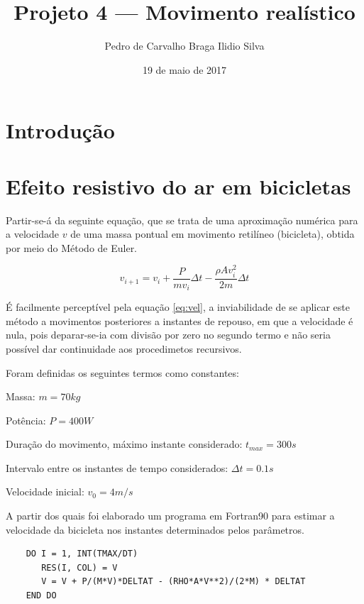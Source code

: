 \message{ !name(relatorio.tex)}\documentclass{article}
\author{Pedro de Carvalho Braga Ilidio Silva}
\title{Projeto 4 — Movimento realístico}
\date{19 de maio de 2017}
\begin{document}

\maketitle
\section{Introdução}

\section{Efeito resistivo do ar em bicicletas}

Partir-se-á da seguinte equação, que se trata de uma aproximação numérica para a velocidade \(v\) de uma massa pontual em movimento retilíneo (bicicleta), obtida por meio do Método de Euler.

\begin{equation}
  \label{eq:vel}
  v_{i+1} = v_i + \frac{P}{mv_i} \Delta t -\frac{\rho Av^2_i}{2m} \Delta t
\end{equation}

É facilmente perceptível pela equação \ref{eq:vel}, a inviabilidade de se aplicar este método a movimentos posteriores a instantes de repouso, em que a velocidade é nula, pois deparar-se-ia com divisão por zero no segundo termo e não seria possível dar continuidade aos procedimetos recursivos.\par
Foram definidas os seguintes termos como constantes:

\begin{list}{}{}
\item Massa: \(m = 70 kg\)
\item Potência: \(P = 400 W\)
\item Duração do movimento, máximo instante considerado: \(t_{max}=300 s\)
\item Intervalo entre os instantes de tempo considerados: \(\Delta t = 0.1s\)
\item Velocidade inicial: \(v_0 = 4 m/s\)
\end{list}

A partir dos quais foi elaborado um programa em Fortran90 para estimar a velocidade da bicicleta nos instantes determinados pelos parâmetros.

\begin{lstlisting}
    DO I = 1, INT(TMAX/DT)
       RES(I, COL) = V
       V = V + P/(M*V)*DELTAT - (RHO*A*V**2)/(2*M) * DELTAT
    END DO
\end{lstlisting}
\end{document}
